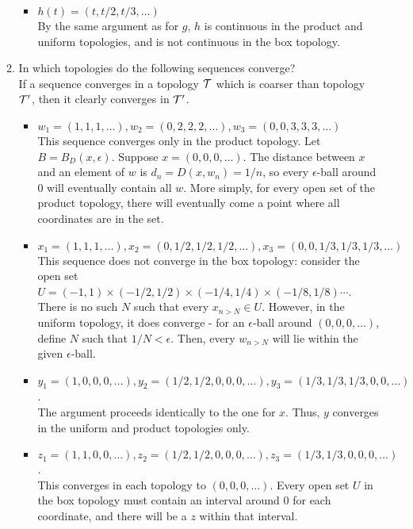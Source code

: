 \documentclass[12pt,letterpaper]{article}
\begin{document}
\begin{enumerate}
\begin{enumerate}
\begin{itemize}
      \item $h(t) = (t, t/2, t/3, \dots)$ \\
      By the same argument as for $g$, $h$ is continuous in the product and uniform topologies, and is not continuous in the box topology. 
    \end{itemize}
    \item In which topologies do the following sequences converge? \\
    If a sequence converges in a topology $\mathcal{T}$ which is coarser than topology $\mathcal{T}'$, then it clearly converges in $\mathcal{T}'$.
    \begin{itemize}
      \item $w_1 = (1,1,1,\dots), w_2=(0,2,2,2,\dots), w_3=(0,0,3,3,3,\dots)$ \\
      This sequence converges only in the product topology. Let $B=B_D(x, \epsilon)$. Suppose $x=(0,0,0,\dots)$. The distance between $x$ and an element of $w$ is $d_n = D(x,w_n) = 1/n$, so every $\epsilon$-ball around $0$ will eventually contain all $w$. More simply, for every open set of the product topology, there will eventually come a point where all coordinates are in the set.
      \item $x_1 = (1,1,1,\dots), x_2=(0,1/2,1/2,1/2,\dots), x_3=(0,0,1/3,1/3,1/3,\dots)$\\
      This sequence does not converge in the box topology: consider the open set $U=(-1,1)\times (-1/2,1/2)\times (-1/4,1/4)\times (-1/8,1/8)\cdots$. There is no such $N$ such that every $x_{n>N}\in U$. However, in the uniform topology, it does converge - for an $\epsilon$-ball around $(0,0,0,\dots)$, define $N$ such that $1/N<\epsilon$. Then, every $w_{n>N}$ will lie within the given $\epsilon$-ball.
      \item $y_1 = (1,0,0,0,\dots), y_2=(1/2,1/2,0,0,0,\dots), y_3=(1/3,1/3,1/3,0,0,\dots)$. \\
      The argument proceeds identically to the one for $x$. Thus, $y$ converges in the uniform and product topologies only.
      \item $z_1 = (1,1,0,0,\dots), z_2=(1/2,1/2,0,0,0,\dots), z_3=(1/3,1/3,0,0,0,\dots)$. \\
      This converges in each topology to $(0,0,0,\dots)$. Every open set $U$ in the box topology must contain an interval around $0$ for each coordinate, and there will be a $z$ within that interval.
    \end{itemize}

\end{enumerate}
\end{enumerate}
\end{document}
